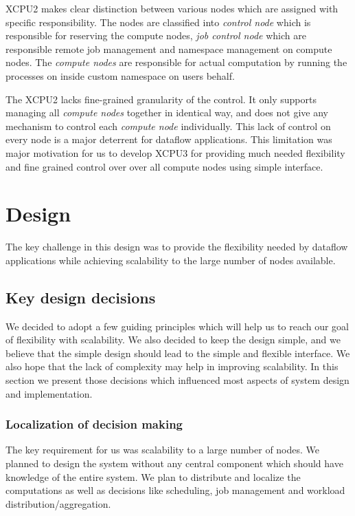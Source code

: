 \documentclass[conference]{IEEEtran}
\begin{document}
XCPU2 makes clear distinction between various nodes which are assigned with
specific responsibility.  The nodes are classified into \textit{control node}
which is responsible for reserving the compute nodes, \textit{job control node}
which are responsible remote job management and namespace management on compute
nodes. The \textit{compute nodes} are responsible for actual computation
by running the processes on inside custom namespace on users behalf.
 
The XCPU2 lacks fine-grained granularity of the control.  It only supports
managing all \textit{compute nodes} together in identical way, and does not
give any mechanism to control each \textit{compute node} individually.  This
lack of control on every node is a major deterrent for dataflow applications.
This limitation was major motivation for us to develop XCPU3 for providing much
needed flexibility and fine grained control over over all compute nodes using
simple interface.



\section{Design}

The key challenge in this design was to provide the flexibility needed by
dataflow applications while achieving scalability to the large number of nodes
available. 

\subsection{Key design decisions}

We decided to adopt a few guiding principles which will help us to reach our
goal of flexibility with scalability.  We also decided to keep the design simple,
and we believe that the simple design should lead to the simple and flexible
interface. We also hope that the lack of complexity may help in improving
scalability. In this section we present those decisions which influenced most
aspects of system design and implementation.

\subsubsection{Localization of decision making}
The key requirement for us was scalability to a large number of nodes.  We
planned to design the system without any central component which should have
knowledge of the entire system.  We plan to distribute and localize the
computations as well as decisions like scheduling, job management and
workload distribution/aggregation.
\end{document}
